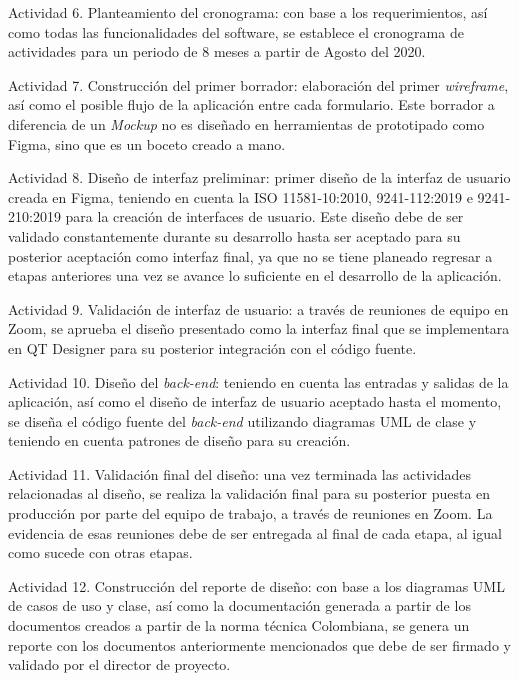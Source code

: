 \begin{APAitemize}
    \item Actividad 6. Planteamiento del cronograma: con base a los requerimientos, así como todas las funcionalidades del software, se establece el cronograma de actividades para un periodo de 8 meses a partir de Agosto del 2020.
    \item Actividad 7. Construcción del primer borrador: elaboración del primer \textit{wireframe}, así como el posible flujo de la aplicación entre cada formulario. Este borrador a diferencia de un \textit{Mockup} no es diseñado en herramientas de prototipado como Figma, sino que es un boceto creado a mano.
    \item Actividad 8. Diseño de interfaz preliminar: primer diseño de la interfaz de usuario creada en Figma, teniendo en cuenta la ISO 11581-10:2010, 9241-112:2019 e 9241-210:2019 para la creación de interfaces de usuario. Este diseño debe de ser validado constantemente durante su desarrollo hasta ser aceptado para su posterior aceptación como interfaz final, ya que no se tiene planeado regresar a etapas anteriores una vez se avance lo suficiente en el desarrollo de la aplicación.
    \item Actividad 9. Validación de interfaz de usuario: a través de reuniones de equipo en Zoom, se aprueba el diseño presentado como la interfaz final que se implementara en QT Designer para su posterior integración con el código fuente.
    \item Actividad 10. Diseño del \textit{back-end}: teniendo en cuenta las entradas y salidas de la aplicación, así como el diseño de interfaz de usuario aceptado hasta el momento, se diseña el código fuente del \textit{back-end} utilizando diagramas UML de clase y teniendo en cuenta patrones de diseño para su creación.
    \item Actividad 11. Validación final del diseño: una vez terminada las actividades relacionadas al diseño, se realiza la validación final para su posterior puesta en producción por parte del equipo de trabajo, a través de reuniones en Zoom. La evidencia de esas reuniones debe de ser entregada al final de cada etapa, al igual como sucede con otras etapas.
    \item Actividad 12. Construcción del reporte de diseño: con base a los diagramas UML de casos de uso y clase, así como la documentación generada a partir de los documentos creados a partir de la norma técnica Colombiana, se genera un reporte con los documentos anteriormente mencionados que debe de ser firmado y validado por el director de proyecto.
\end{APAitemize}

